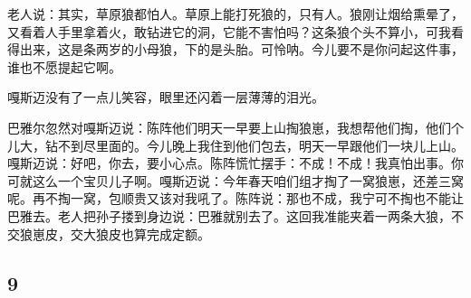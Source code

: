 \par 老人说：其实，草原狼都怕人。草原上能打死狼的，只有人。狼刚让烟给熏晕了，又看着人手里拿着火，敢钻进它的洞，它能不害怕吗？这条狼个头不算小，可我看得出来，这是条两岁的小母狼，下的是头胎。可怜呐。今儿要不是你问起这件事，谁也不愿提起它啊。
\par 嘎斯迈没有了一点儿笑容，眼里还闪着一层薄薄的泪光。
\par 巴雅尔忽然对嘎斯迈说：陈阵他们明天一早要上山掏狼崽，我想帮他们掏，他们个儿大，钻不到尽里面的。今儿晚上我住到他们包去，明天一早跟他们一块儿上山。嘎斯迈说：好吧，你去，要小心点。陈阵慌忙摆手：不成！不成！我真怕出事。你可就这么一个宝贝儿子啊。嘎斯迈说：今年春天咱们组才掏了一窝狼崽，还差三窝呢。再不掏一窝，包顺贵又该对我吼了。陈阵说：那也不成，我宁可不掏也不能让巴雅去。老人把孙子搂到身边说：巴雅就别去了。这回我准能夹着一两条大狼，不交狼崽皮，交大狼皮也算完成定额。



\subsection*{9}



